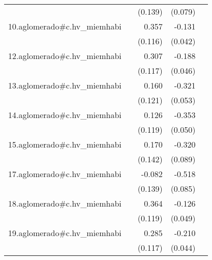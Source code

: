 {\begin{longtable}{l*{4}{D{.}{.}{-1}}}
            &                     &     (0.139)         &     (0.079)         &                     \\
\addlinespace
10.aglomerado#c.hv\_miemhabi&                     &       0.357\sym{**} &      -0.131\sym{**} &                     \\
            &                     &     (0.116)         &     (0.042)         &                     \\
\addlinespace
12.aglomerado#c.hv\_miemhabi&                     &       0.307\sym{**} &      -0.188\sym{***}&                     \\
            &                     &     (0.117)         &     (0.046)         &                     \\
\addlinespace
13.aglomerado#c.hv\_miemhabi&                     &       0.160         &      -0.321\sym{***}&                     \\
            &                     &     (0.121)         &     (0.053)         &                     \\
\addlinespace
14.aglomerado#c.hv\_miemhabi&                     &       0.126         &      -0.353\sym{***}&                     \\
            &                     &     (0.119)         &     (0.050)         &                     \\
\addlinespace
15.aglomerado#c.hv\_miemhabi&                     &       0.170         &      -0.320\sym{***}&                     \\
            &                     &     (0.142)         &     (0.089)         &                     \\
\addlinespace
17.aglomerado#c.hv\_miemhabi&                     &      -0.082         &      -0.518\sym{***}&                     \\
            &                     &     (0.139)         &     (0.085)         &                     \\
\addlinespace
18.aglomerado#c.hv\_miemhabi&                     &       0.364\sym{**} &      -0.126\sym{*}  &                     \\
            &                     &     (0.119)         &     (0.049)         &                     \\
\addlinespace
19.aglomerado#c.hv\_miemhabi&                     &       0.285\sym{*}  &      -0.210\sym{***}&                     \\
            &                     &     (0.117)         &     (0.044)         &                     \\

\end{longtable}}
